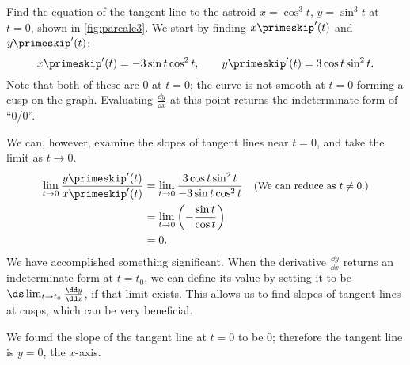 \begin{example}\label{ex_parcalc3}
Find the equation of the tangent line to the astroid $x=\cos^3 t$, $y=\sin^3t$ at $t=0$, shown in \autoref{fig:parcalc3}.
\solution
We start by finding $x\primeskip'(t)$ and $y\primeskip'(t)$:
%
%
\[x\primeskip'(t) = -3\sin t\cos^2t, \qquad y\primeskip'(t) = 3\cos t\sin^2t.\]
Note that both of these are 0 at $t=0$; the curve is not smooth at $t=0$ forming a cusp on the graph. Evaluating $\frac{\dd y}{\dd x}$ at this point returns the indeterminate form of ``0/0''. 

We can, however, examine the slopes of tangent lines near $t=0$, and take the limit as $t\to 0$. 
\begin{align*}
	\lim_{t\to0} \frac{y\primeskip'(t)}{x\primeskip'(t)}
	&=\lim_{t\to0} \frac{3\cos t\sin^2t}{-3\sin t\cos^2t}
	\quad \text{\small (We can reduce as $t\neq 0$.)}\\
	&= \lim_{t\to0}\left(-\frac{\sin t}{\cos t}\right)\\
	&= 0.
\end{align*}
We have accomplished something significant. When the derivative $\frac{\dd y}{\dd x}$ returns an indeterminate form at $t=t_0$, we can define its value by setting it to be $\ds \lim_{t\to t_0}\frac{\dd y}{\dd x}$, if that limit exists. This allows us to find slopes of tangent lines at cusps, which can be very beneficial. 

We found the slope of the tangent line at $t=0$ to be 0; therefore the tangent line is $y=0$, the $x$-axis.
\end{example}


